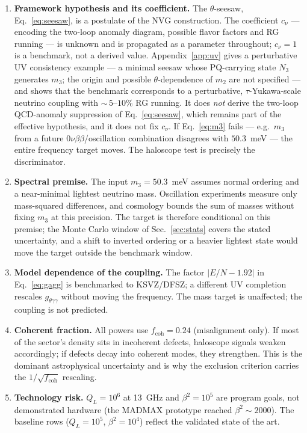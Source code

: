 \documentclass[11pt,a4paper]{article}
\begin{document}
\begin{enumerate}
\item \textbf{Framework hypothesis and its coefficient.} The $\theta$-seesaw,
Eq.~\eqref{eq:seesaw}, is a postulate of the NVG construction. The
coefficient $c_\nu$ --- encoding the two-loop
anomaly diagram, possible flavor factors and RG running --- is unknown and is
propagated as a parameter throughout; $c_\nu = 1$ is a benchmark, not a
derived value. Appendix~\ref{app:uv} gives a perturbative UV consistency
example --- a minimal seesaw whose PQ-carrying state $N_3$ generates
$m_3$; the origin and possible $\theta$-dependence of $m_2$ are not
specified --- and
shows that the
benchmark corresponds to a perturbative, $\tau$-Yukawa-scale neutrino
coupling with ${\sim}\,5$--$10\%$ RG running. It does \emph{not} derive the
two-loop QCD-anomaly suppression of Eq.~\eqref{eq:seesaw}, which remains
part of the effective hypothesis, and it does not fix $c_\nu$.
If Eq.~\eqref{eq:m3} fails --- e.g.\
$m_3$ from a future
0$\nu\beta\beta$/oscillation combination disagrees with $50.3$~meV --- the
entire frequency target moves. The haloscope test is precisely the
discriminator.
\item \textbf{Spectral premise.} The input $m_3 = 50.3$~meV assumes normal
ordering and a near-minimal lightest neutrino mass. Oscillation experiments
measure only mass-squared differences, and cosmology bounds the sum of masses
without fixing $m_3$ at this precision. The target is therefore conditional on
this premise; the Monte Carlo window of Sec.~\ref{sec:stats} covers the
stated uncertainty, and a shift to inverted ordering or a heavier lightest
state would move the target outside the benchmark window.
\item \textbf{Model dependence of the coupling.} The factor
$|E/N - 1.92|$ in Eq.~\eqref{eq:gagg} is benchmarked to KSVZ/DFSZ; a
different UV completion rescales $g_{\theta\gamma\gamma}$ without moving the
frequency. The mass target is unaffected; the coupling is not predicted.
\item \textbf{Coherent fraction.} All powers use $f_{\mathrm{coh}} = 0.24$
(misalignment only). If most of the sector's density sits in incoherent defects,
haloscope signals weaken accordingly; if defects decay into coherent modes, they
strengthen. This is the dominant astrophysical uncertainty and is why the
exclusion criterion carries the $1/\sqrt{f_{\mathrm{coh}}}$ rescaling.
\item \textbf{Technology risk.} $Q_L = 10^6$ at 13~GHz and $\beta^2 = 10^5$
are program goals, not demonstrated hardware (the MADMAX prototype reached
$\beta^2 \sim 2000$). The baseline rows ($Q_L = 10^5$, $\beta^2 = 10^4$)
reflect the validated state of the art.
\end{enumerate}
\end{document}

